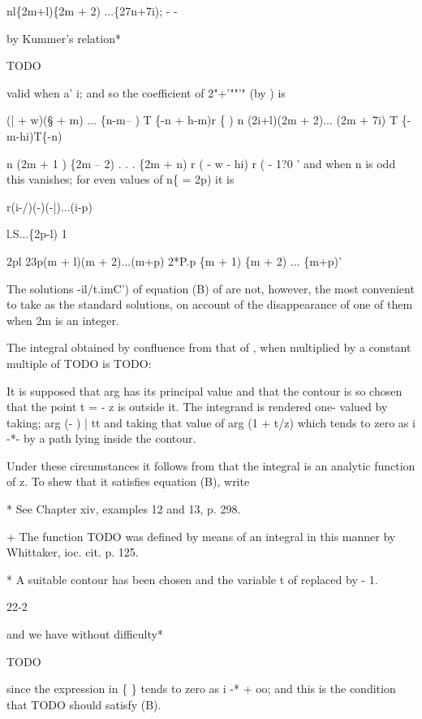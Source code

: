 nl\{2m+l)\{2m + 2) ...\{27n+7i); - -

by Kummer's relation*

TODO

valid when a' i; and so the coefficient of 2"+'""'" (by
) is

(| + w)(§ + m) ... \{n-m-- ) T \{-n + h-m)r \{ ) n (2i+l)(2m +
2)... (2m + 7i) T \{-m-hi)T\{-n)

n (2m + 1 ) \{2m -- 2) . . . \{2m + n) r ( - w - hi) r ( - 1?0 '
and when n is odd this vanishes; for even values of n\{ = 2p) it is

r(i-/)(-)(-|)...(i-p)

l.S...\{2p-l) 1

2pl 23p(m + l)(m + 2)...(m+p) 2*P.p \{m + 1) \{m + 2) ... \{m+p)'


The solutions -il/t.imC') of equation (B) of  are not,
however, the most convenient to take as the standard solutions, on
account of the disappearance of one of them when 2m is an integer.

The integral obtained by confluence from that of , when
multiplied by a constant multiple of TODO is TODO:

It is supposed that arg has its principal value and that the contour
is so chosen that the point t = - z is outside it. The integrand is
rendered one- valued by taking; arg (- ) |  tt and taking that
value of arg (1 + t/z) which tends to zero as i -*- by a path lying
inside the contour.

Under these circumstances it follows from  that the integral is
an analytic function of z. To shew that it satisfies equation (B),
write

* See Chapter xiv, examples 12 and 13, p. 298.

+ The function TODO was defined by means of an integral in this manner
by Whittaker, ioc. cit. p. 125.

* A suitable contour has been chosen and the variable t of 
replaced by - 1.

22-2

%
%

and we have without difficulty*

TODO

since the expression in \{ \} tends to zero as i -* + oo; and this is
the condition that TODO should satisfy (B).

